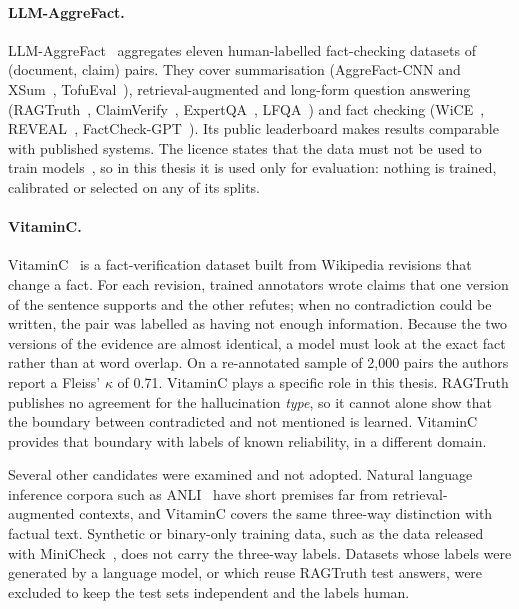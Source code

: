\paragraph{LLM-AggreFact.} LLM-AggreFact~\cite{tang2024minicheck,llmaggrefact} aggregates eleven human-labelled
fact-checking datasets of (document, claim) pairs. They cover summarisation (AggreFact-CNN and
XSum~\cite{tang2023aggrefact}, TofuEval~\cite{tang2024tofueval}), retrieval-augmented and long-form question answering
(RAGTruth~\cite{niu2024ragtruth}, ClaimVerify~\cite{liu2023verifiability}, ExpertQA~\cite{malaviya2024expertqa},
LFQA~\cite{chen2024lfqa}) and fact checking (WiCE~\cite{kamoi2023wice}, REVEAL~\cite{jacovi2024reveal},
FactCheck-GPT~\cite{wang2024factcheckbench}). Its public leaderboard makes results comparable with published systems.
The licence states that the data must not be used to train models~\cite{hf_llmaggrefact}, so in this thesis it is used
only for evaluation: nothing is trained, calibrated or selected on any of its splits.

\paragraph{VitaminC.} VitaminC~\cite{schuster2021vitaminc,hf_vitaminc} is a fact-verification dataset built from
Wikipedia revisions that change a fact. For each revision, trained annotators wrote claims that one version of the
sentence supports and the other refutes; when no contradiction could be written, the pair was labelled as having not
enough information. Because the two versions of the evidence are almost identical, a model must look at the exact fact
rather than at word overlap. On a re-annotated sample of 2{,}000 pairs the authors report a Fleiss' $\kappa$ of 0.71.
VitaminC plays a specific role in this thesis. RAGTruth publishes no agreement for the hallucination \emph{type}, so
it cannot alone show that the boundary between contradicted and not mentioned is learned. VitaminC provides that
boundary with labels of known reliability, in a different domain.

Several other candidates were examined and not adopted. Natural language inference corpora such as
ANLI~\cite{nie2020anli} have short premises far from retrieval-augmented contexts, and VitaminC covers the same
three-way distinction with factual text. Synthetic or binary-only training data, such as the data released with
MiniCheck~\cite{tang2024minicheck}, does not carry the three-way labels. Datasets whose labels were generated by a
language model, or which reuse RAGTruth test answers, were excluded to keep the test sets independent and the labels
human.


